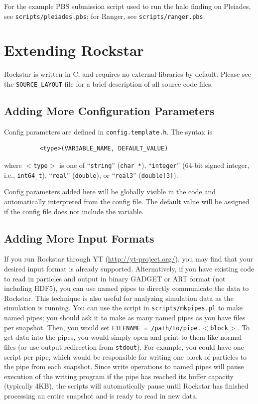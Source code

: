 \documentclass[12pt]{article}
\begin{document}
      For the example PBS submission script used to run the halo finding on
      Pleiades, see \texttt{scripts/pleiades.pbs}; for Ranger, see \texttt{scripts/ranger.pbs}.

\section{Extending Rockstar}

	Rockstar is written in C, and requires no external libraries by default.  Please see the \texttt{SOURCE\_LAYOUT} file for a brief description of all source code files.

\subsection{Adding More Configuration Parameters}
      Config parameters are defined in \texttt{config.template.h}.  The syntax is
\begin{verbatim}
          <type>(VARIABLE_NAME, DEFAULT_VALUE)
\end{verbatim}      
      where \texttt{$<$type$>$} is one of
      ``\texttt{string}'' (\texttt{char *}), ``\texttt{integer}'' (64-bit signed integer, i.e., \texttt{int64\_t}),
      ``\texttt{real}'' (\texttt{double}), or ``\texttt{real3}'' (\texttt{double[3]}).

      Config parameters added here will be globally visible in the code
      and automatically interpreted from the config file.  The default
      value will be assigned if the config file does not include the
      variable.
      
\subsection{Adding More Input Formats}
\label{s:input_formats}
	If you run Rockstar through YT (\url{http://yt-project.org/}), you may find that your desired input format is already supported.  Alternatively, if you have existing code to read in particles and output in binary GADGET or ART format (not including HDF5), you can use named pipes to directly communicate the data to Rockstar.  This technique is also useful for analyzing simulation data as the simulation is running.  You can use the script in \texttt{scripts/mkpipes.pl} to make named pipes; you should ask it to make as many named pipes as you have files per snapshot.  Then, you would set \texttt{FILENAME = /path/to/pipe.$<$block$>$}.  To get data into the pipes, you would simply open and print to them like normal files (or use output redirection from \texttt{stdout}).  For example, you could have one script per pipe, which would be responsible for writing one block of particles to the pipe from each snapshot.  Since write operations to named pipes will pause execution of the writing program if the pipe has reached its buffer capacity (typically 4KB), the scripts will automatically pause until Rockstar has finished processing an entire snapshot and is ready to read in new data.
	
\end{document}
